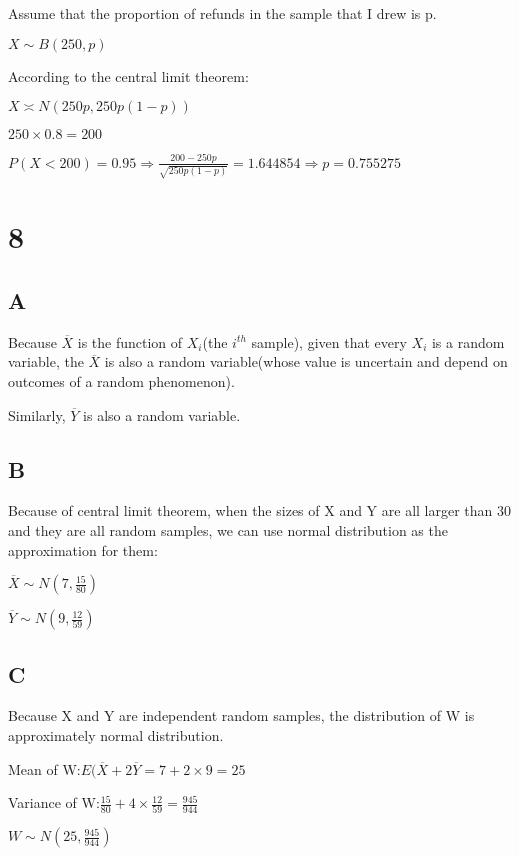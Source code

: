 \documentclass{article}
\begin{document}
	Assume that the proportion of refunds in the sample that I drew is p.
	
	$X\sim B(250,p)$
	
	According to the central limit theorem:
	
	$X\asymp N(250p,250p(1-p))$
	
	$250\times 0.8=200$
	
	$P(X<200)=0.95\Rightarrow \frac{200-250p}{\sqrt{250p(1-p)}}=1.644854\Rightarrow p=0.755275$
	
	
	
	\section*{8}
	
	\subsection*{A}
	
	Because $\overline{X}$ is the function of $X_i$(the $i^{th}$ sample), given that every $X_i$ is a random variable, the $\overline{X}$ is also a random variable(whose value is uncertain and depend on outcomes of a random phenomenon).
	
	Similarly, $\overline{Y}$ is also a random variable.
	
	\subsection*{B}
	
	Because of central limit theorem, when the sizes of X and Y are all larger than 30 and they are all random samples, we can use normal distribution as the approximation for them:
	
	$\overline{X}\sim N(7,\frac{15}{80}) $
	
	$\overline{Y}\sim N(9,\frac{12}{59}) $
	
	\subsection*{C}
	
	Because X and Y are independent random samples, the distribution of W is approximately normal distribution.
	
	Mean of W:$E(\overline{X}+2\overline{Y}=7+2\times 9=25$
	
	Variance of W:$\frac{15}{80}+4\times \frac{12}{59}=\frac{945}{944}$
	
	$W\sim N(25,\frac{945}{944})$ 
	
\end{document}

